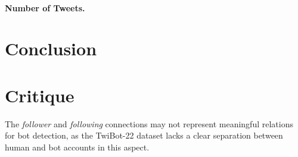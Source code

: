 \documentclass[12pt, a4paper]{article}
\begin{document}
        \paragraph{Number of Tweets.}


\section{Conclusion}
	\label{conclusion}


\section{Critique}
	\label{critique}
	The \textit{follower} and \textit{following} connections may not represent meaningful relations for bot detection, as the TwiBot-22 dataset lacks a clear separation between human and bot accounts in this aspect.




\end{document}
